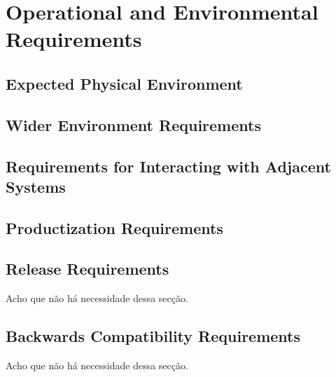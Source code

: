 \chapter{Operational and Environmental Requirements}

\section{Expected Physical Environment}

\section{Wider Environment Requirements}

\section{Requirements for Interacting with Adjacent Systems}

\section{Productization Requirements}

\section{Release Requirements}
Acho que não há necessidade dessa secção.

\section{Backwards Compatibility Requirements}
Acho que não há necessidade dessa secção.